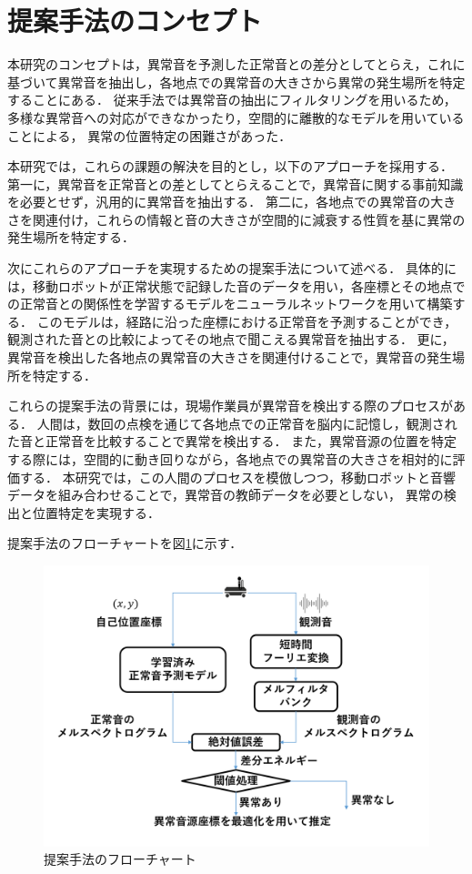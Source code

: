 \documentclass[../main]{subfiles}
\begin{document}
\section{提案手法のコンセプト}
\label{sec:pmethod_concept}
本研究のコンセプトは，異常音を予測した正常音との差分としてとらえ，これに基づいて異常音を抽出し，各地点での異常音の大きさから異常の発生場所を特定することにある．
従来手法では異常音の抽出にフィルタリングを用いるため，多様な異常音への対応ができなかったり，空間的に離散的なモデルを用いていることによる，
異常の位置特定の困難さがあった．

本研究では，これらの課題の解決を目的とし，以下のアプローチを採用する．
第一に，異常音を正常音との差としてとらえることで，異常音に関する事前知識を必要とせず，汎用的に異常音を抽出する．
第二に，各地点での異常音の大きさを関連付け，これらの情報と音の大きさが空間的に減衰する性質を基に異常の発生場所を特定する．


次にこれらのアプローチを実現するための提案手法について述べる．
具体的には，移動ロボットが正常状態で記録した音のデータを用い，各座標とその地点での正常音との関係性を学習するモデルをニューラルネットワークを用いて構築する．
このモデルは，経路に沿った座標における正常音を予測することができ，観測された音との比較によってその地点で聞こえる異常音を抽出する．
更に，異常音を検出した各地点の異常音の大きさを関連付けることで，異常音の発生場所を特定する．

これらの提案手法の背景には，現場作業員が異常音を検出する際のプロセスがある．
人間は，数回の点検を通じて各地点での正常音を脳内に記憶し，観測された音と正常音を比較することで異常を検出する．
また，異常音源の位置を特定する際には，空間的に動き回りながら，各地点での異常音の大きさを相対的に評価する．
本研究では，この人間のプロセスを模倣しつつ，移動ロボットと音響データを組み合わせることで，異常音の教師データを必要としない，
異常の検出と位置特定を実現する．

提案手法のフローチャートを図\ref{fig:flowchart}に示す．


\begin{figure}[t]
  \centering
  \includegraphics[keepaspectratio, width=1.0\linewidth]{chap3/flowchart_proposed_method.png}
  \caption{提案手法のフローチャート}
  \label{fig:flowchart}
\end{figure}
\end{document}
